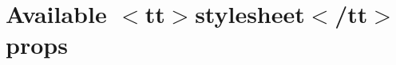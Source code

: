 \chapter{Available \texorpdfstring{$<$}{<}tt\texorpdfstring{$>$}{>}stylesheet\texorpdfstring{$<$}{<}/tt\texorpdfstring{$>$}{>} props}
\hypertarget{md_node__modules_2react-syntax-highlighter_2_a_v_a_i_l_a_b_l_e___s_t_y_l_e_s___p_r_i_s_m}{}\label{md_node__modules_2react-syntax-highlighter_2_a_v_a_i_l_a_b_l_e___s_t_y_l_e_s___p_r_i_s_m}
\label{md_node__modules_2react-syntax-highlighter_2_a_v_a_i_l_a_b_l_e___s_t_y_l_e_s___p_r_i_s_m_autotoc_md27169}%
%



